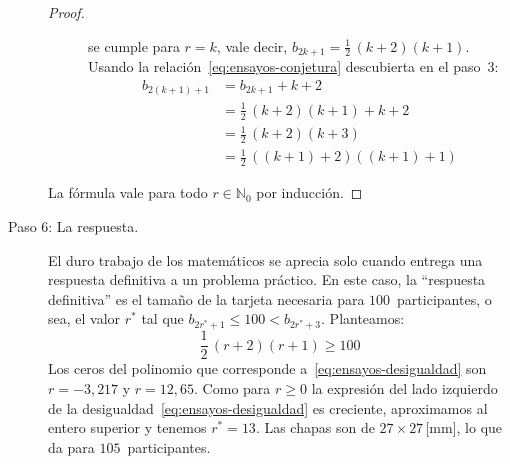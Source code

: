 \begin{solution}
\begin{description}
\begin{proof}
\begin{description}
	  se cumple para \(r = k\),
	  vale decir,
	  \(b_{2 k + 1} = \frac{1}{2} \, (k + 2) (k + 1)\).
	  Usando la relación~\eqref{eq:ensayos-conjetura}
	  descubierta en el paso~3:
	  \begin{align*}
	    b_{2 (k + 1) + 1}
	      &= b_{2 k + 1} + k + 2 \\
	      &= \frac{1}{2} \, (k + 2) (k + 1) + k + 2 \\
	      &= \frac{1}{2} \, (k + 2) (k + 3) \\
	      &= \frac{1}{2} \, ((k + 1) + 2) ((k + 1) + 1)
	  \end{align*}
	\end{description}
	La fórmula vale
	para todo \(r \in \mathbb{N}_0\) por inducción.
      \end{proof}
    \item[Paso 6: La respuesta.]
      El duro trabajo de los matemáticos
      se aprecia solo cuando entrega una respuesta definitiva
      a un problema práctico.
      En este caso,
      la ``respuesta definitiva'' es el tamaño de la tarjeta
      necesaria para \(100\)~participantes,
      o sea,
      el valor \(r^*\)
      tal que \(b_{2 r^* + 1} \le 100 < b_{2 r^* + 3}\).
      Planteamos:
      \begin{equation}
	\label{eq:ensayos-desigualdad}
	\frac{1}{2} \, (r + 2) (r + 1)
	  \ge 100
      \end{equation}
      Los ceros del polinomio que corresponde
      a~\eqref{eq:ensayos-desigualdad}
      son \(r = -3,217\) y \(r = 12,65\).
      Como para \(r \ge 0\)
      la expresión
      del lado izquierdo
      de la desigualdad~\eqref{eq:ensayos-desigualdad}
      es creciente,
      aproximamos al entero superior y tenemos \(r^* = 13\).
      Las chapas son de \(27 \times 27\)\,[mm],
      lo que da para \(105\)~participantes.
    \end{description}
  \end{solution}

